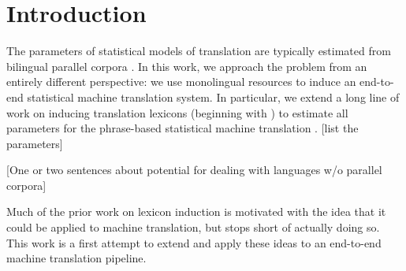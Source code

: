 \documentclass[11pt]{article}
\newcommand{\mnote}[1]{\marginpar{%
  \vskip-\baselineskip
  \raggedright\footnotesize
  \itshape\hrule\smallskip\tiny{#1}\par\smallskip\hrule}}
\newcommand{\mtodo}[1]{\mnote{\textcolor{red}{#1}}}
\begin{document}
\begin{abstract}
\end{abstract}


\section{Introduction} \label{sect:intro}


The parameters of statistical models of translation are typically estimated from bilingual parallel corpora \cite{Brown:1993}. 
In this work, we approach the problem from an entirely different perspective: we use monolingual resources to induce an end-to-end statistical machine translation system.  In particular, we extend a long line of work on inducing translation lexicons (beginning with ) to estimate all parameters for the phrase-based statistical machine translation \cite{Koehn:2003}.   [list the parameters]

[One or two sentences about potential for dealing with languages w/o parallel corpora] 

Much of the prior work on lexicon induction is motivated with the idea that it could be applied to machine translation, but stops short of actually doing so.  This work is a first attempt to extend and apply these ideas to an end-to-end machine translation pipeline. 



\end{document}
